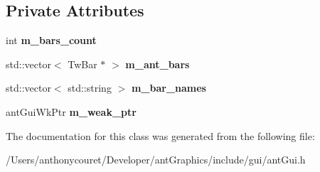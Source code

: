 \subsection*{Private Attributes}
\begin{DoxyCompactItemize}
\item 
\hypertarget{classant_gui_adf2f6e372b6dc46315d66531edf6179f}{int {\bfseries m\+\_\+bars\+\_\+count}}\label{classant_gui_adf2f6e372b6dc46315d66531edf6179f}

\item 
\hypertarget{classant_gui_a4f83fb0fdc6e4f2aa3a2112b3dc23444}{std\+::vector$<$ Tw\+Bar $\ast$ $>$ {\bfseries m\+\_\+ant\+\_\+bars}}\label{classant_gui_a4f83fb0fdc6e4f2aa3a2112b3dc23444}

\item 
\hypertarget{classant_gui_a33923e64b3106da222d90d70bc5b4eec}{std\+::vector$<$ std\+::string $>$ {\bfseries m\+\_\+bar\+\_\+names}}\label{classant_gui_a33923e64b3106da222d90d70bc5b4eec}

\item 
\hypertarget{classant_gui_a0725f279e92c15c3dbf01b222bba1907}{ant\+Gui\+Wk\+Ptr {\bfseries m\+\_\+weak\+\_\+ptr}}\label{classant_gui_a0725f279e92c15c3dbf01b222bba1907}

\end{DoxyCompactItemize}


The documentation for this class was generated from the following file\+:\begin{DoxyCompactItemize}
\item 
/\+Users/anthonycouret/\+Developer/ant\+Graphics/include/gui/ant\+Gui.\+h\end{DoxyCompactItemize}
